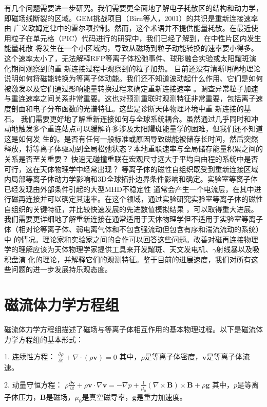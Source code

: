 \documentclass[12pt, a4paper, oneside]{article}
\begin{document}
\begin{spacing}{2.0}
有几个问题需要进一步研究。我们需要更全面地了解电子耗散区的结构和动力学，即磁场线断裂的区域。GEM挑战项目（Birn等人，2001）的共识是重新连接速率由
广义欧姆定律中的霍尔项控制。然而，这个术语并不提供能量耗散。在最近使用粒子在单元格（PIC）代码进行的研究中，我们已经了解到，在中性片区内发生能量耗散
将发生在一个小区域内，导致从磁场到粒子动能转换的速率要小得多。这个速率太小了，无法解释RFP等离子体松弛事件、球形融合实验或太阳耀斑演化期间观察到的重
新连接过程中观察到的粒子加热。
目前还没有清晰明确地理论说明如何将磁能转换为等离子体动能。我们还不知道波动起什么作用、它们是如何被激发以及它们通过影响能量转换过程来确定重新连接速率
。调查异常粒子加速与重连速率之间关系非常重要。这也对预测重联时观测特征非常重要，包括离子速度剖面和电子分布函数的光谱特征。这些是诊断天体物理环境中重
新连接的基石。
我们需要更好地了解重新连接如何与全球系统耦合。虽然通过几乎同时和冲动地触发多个重连站点可以缓解许多涉及太阳耀斑能量学的困难，但我们还不知道这是如何发
生的。是否有任何一般标准或原因导致磁能被储存长时间，然后突然释放，将等离子体驱动到全局松弛状态？本地重联速率与全局储存能量积累之间的关系是否至关重要？
快速无碰撞重联在宏观尺寸远大于平均自由程的系统中是否可行，这在天体物理学中经常出现？
等离子体的磁性自组织既受到重新连接区域内局部等离子体动力学影响和3D全球拓扑边界条件影响和确定。实验室等离子体已经发现由外部条件引起的大型MHD不稳定性
通常会产生一个电流层，在其中进行磁再连接并可以确定其速率。在这个领域，通过实验研究实验室等离子体的磁性自组织的关键特征，并比较快速发展的先进数值模拟结果
，可以取得重大进展。
我们需要更详细地了解重新连接在通常适用于天体物理学但不适用于实验室等离子体（相对论等离子体、弱电离气体和不包含强流动但包含有序和湍流流动的系统）中
的情况。理论家和实验家之间的合作可以回答这些问题。改善对磁再连接物理学的理解应该为天体物理学家提供工具来开发耀斑、天文发电机、$\gamma$射线暴以及吸积盘演
化的理论，并解释它们的观测特征。鉴于目前的进展速度，我们对所有这些问题的进一步发展持乐观态度。




\section{磁流体力学方程组}

磁流体力学方程组描述了磁场与等离子体相互作用的基本物理过程。以下是磁流体力学方程组的基本形式：

1. 连续性方程：
$\displaystyle \frac{\partial \rho}{\partial t} + \nabla \cdot (\rho \mathbf{v}) = 0$
其中，$\rho$是等离子体密度，$\mathbf{v}$是等离子体流速。

2. 动量守恒方程：
$\displaystyle \rho \frac{\partial \mathbf{v}}{\partial t} + \rho \mathbf{v} \cdot \nabla \mathbf{v} = -\nabla p + \frac{1}{\mu_0}(\nabla \times \mathbf{B}) \times \mathbf{B} + \rho \mathbf{g}$
其中，$p$是等离子体压力，$\mathbf{B}$是磁场，$\mu_0$是真空磁导率，$\mathbf{g}$是重力加速度。


\end{spacing}
\end{document}
